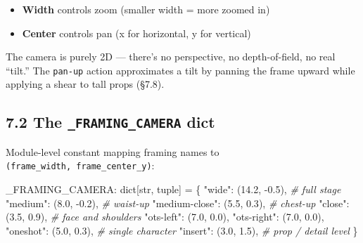 \documentclass[
  11pt,
]{book}
\newenvironment{Shaded}{}{}
\newcommand{\BuiltInTok}[1]{\textcolor[rgb]{0.00,0.50,0.00}{#1}}
\newcommand{\CommentTok}[1]{\textcolor[rgb]{0.38,0.63,0.69}{\textit{#1}}}
\newcommand{\FloatTok}[1]{\textcolor[rgb]{0.25,0.63,0.44}{#1}}
\newcommand{\NormalTok}[1]{#1}
\newcommand{\OperatorTok}[1]{\textcolor[rgb]{0.40,0.40,0.40}{#1}}
\newcommand{\StringTok}[1]{\textcolor[rgb]{0.25,0.44,0.63}{#1}}
\providecommand{\tightlist}{%
  \setlength{\itemsep}{0pt}\setlength{\parskip}{0pt}}
\begin{document}
\begin{itemize}
\tightlist
\item
  \textbf{Width} controls zoom (smaller width = more zoomed in)
\item
  \textbf{Center} controls pan (x for horizontal, y for vertical)
\end{itemize}

The camera is purely 2D --- there's no perspective, no depth-of-field,
no real ``tilt.'' The \texttt{pan-up} action approximates a tilt by
panning the frame upward while applying a shear to tall props (§7.8).

\subsection{\texorpdfstring{7.2 The \texttt{\_FRAMING\_CAMERA}
dict}{7.2 The \_FRAMING\_CAMERA dict}}\label{the-_framing_camera-dict}

Module-level constant mapping framing names to
\texttt{(frame\_width,\ frame\_center\_y)}:

\begin{Shaded}
\begin{Highlighting}[]
\NormalTok{\_FRAMING\_CAMERA: }\BuiltInTok{dict}\NormalTok{[}\BuiltInTok{str}\NormalTok{, }\BuiltInTok{tuple}\NormalTok{] }\OperatorTok{=}\NormalTok{ \{}
    \StringTok{"wide"}\NormalTok{:         (}\FloatTok{14.2}\NormalTok{, }\OperatorTok{{-}}\FloatTok{0.5}\NormalTok{),   }\CommentTok{\# full stage}
    \StringTok{"medium"}\NormalTok{:       (}\FloatTok{8.0}\NormalTok{,  }\OperatorTok{{-}}\FloatTok{0.2}\NormalTok{),   }\CommentTok{\# waist{-}up}
    \StringTok{"medium{-}close"}\NormalTok{: (}\FloatTok{5.5}\NormalTok{,   }\FloatTok{0.3}\NormalTok{),   }\CommentTok{\# chest{-}up}
    \StringTok{"close"}\NormalTok{:        (}\FloatTok{3.5}\NormalTok{,   }\FloatTok{0.9}\NormalTok{),   }\CommentTok{\# face and shoulders}
    \StringTok{"ots{-}left"}\NormalTok{:     (}\FloatTok{7.0}\NormalTok{,   }\FloatTok{0.0}\NormalTok{),}
    \StringTok{"ots{-}right"}\NormalTok{:    (}\FloatTok{7.0}\NormalTok{,   }\FloatTok{0.0}\NormalTok{),}
    \StringTok{"oneshot"}\NormalTok{:      (}\FloatTok{5.0}\NormalTok{,   }\FloatTok{0.3}\NormalTok{),   }\CommentTok{\# single character}
    \StringTok{"insert"}\NormalTok{:       (}\FloatTok{3.0}\NormalTok{,   }\FloatTok{1.5}\NormalTok{),   }\CommentTok{\# prop / detail level}
\NormalTok{\}}
\end{Highlighting}
\end{Shaded}
\end{document}

